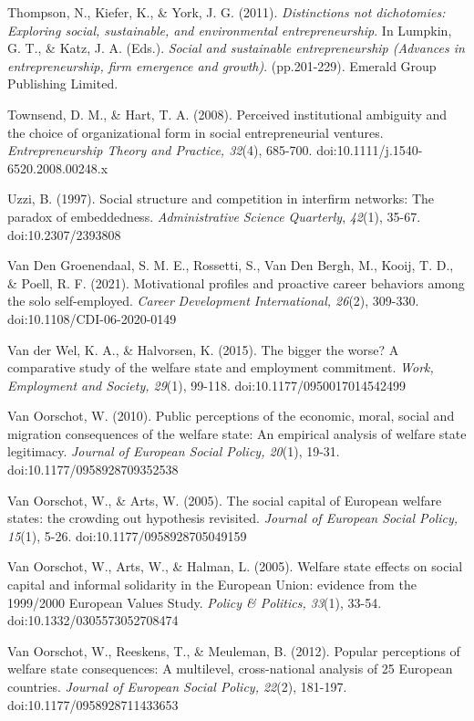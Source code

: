 \documentclass{article}
\begin{document}
Thompson, N., Kiefer, K., \& York, J. G. (2011). \emph{Distinctions not dichotomies: Exploring social, sustainable, and environmental entrepreneurship}. In Lumpkin, G. T., \& Katz, J. A. (Eds.). \emph{Social and sustainable entrepreneurship (Advances in entrepreneurship, firm emergence and growth)}. (pp.201-229). Emerald Group Publishing Limited.

Townsend, D. M., \& Hart, T. A. (2008). Perceived institutional ambiguity and the choice of organizational form in social entrepreneurial ventures. \emph{Entrepreneurship Theory and Practice, 32}(4), 685-700. doi:10.1111/j.1540-6520.2008.00248.x

Uzzi, B. (1997). Social structure and competition in interfirm networks: The paradox of embeddedness. \emph{Administrative}\emph{ }\emph{Science}\emph{ }\emph{Quarterly}, \emph{42}(1), 35-67. doi:10.2307/2393808

Van Den Groenendaal, S. M. E., Rossetti, S., Van Den Bergh, M., Kooij, T. D., \& Poell, R. F. (2021). Motivational profiles and proactive career behaviors among the solo self-employed. \emph{Career}\emph{ Development International, 26}(2), 309-330. doi:10.1108/CDI-06-2020-0149

Van der Wel, K. A., \& Halvorsen, K. (2015). The bigger the worse? A comparative study of the welfare state and employment commitment. \emph{Work, Employment and Society, 29}(1), 99-118. doi:10.1177/0950017014542499

Van Oorschot, W. (2010). Public perceptions of the economic, moral, social and migration consequences of the welfare state: An empirical analysis of welfare state legitimacy. \emph{Journal of European Social Policy, 20}(1), 19-31. doi:10.1177/0958928709352538

Van Oorschot, W., \& Arts, W. (2005). The social capital of European welfare states: the crowding out hypothesis revisited. \emph{Journal of European Social Policy, 15}(1), 5-26. doi:10.1177/0958928705049159 

Van Oorschot, W., Arts, W., \& Halman, L. (2005). Welfare state effects on social capital and informal solidarity in the European Union: evidence from the 1999/2000 European Values Study. \emph{Policy \& Politics, 33}(1), 33-54. doi:10.1332/0305573052708474

Van Oorschot, W., Reeskens, T., \& Meuleman, B. (2012). Popular perceptions of welfare state consequences: A multilevel, cross-national analysis of 25 European countries. \emph{Journal of European Social Policy, 22}(2), 181-197. doi:10.1177/0958928711433653
\end{document}
